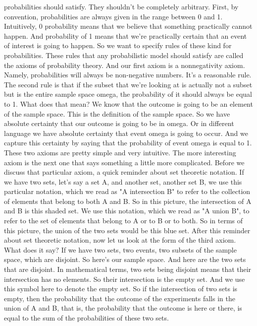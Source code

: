 \documentclass[pdftex, brazil, 12pt, twoside]{article}
\begin{document}
probabilities should satisfy.
They shouldn't be completely arbitrary.
First, by convention, probabilities are always given
in the range between 0 and 1.
Intuitively, 0 probability means that we believe that
something practically cannot happen.
And probability of 1 means that we're practically certain
that an event of interest is going to happen.
So we want to specify rules of these kind for probabilities.
These rules that any probabilistic model should
satisfy are called the axioms of probability theory.
And our first axiom is a nonnegativity axiom.
Namely, probabilities will always be
non-negative numbers.
It's a reasonable rule.
The second rule is that if the subset that we're looking at
is actually not a subset but is the entire sample space
omega, the probability of it should always be equal to 1.
What does that mean?
We know that the outcome is going to be an element of the
sample space.
This is the definition of the sample space.
So we have absolute certainty that our outcome is going to
be in omega.
Or in different language we have absolute certainty that
event omega is going to occur.
And we capture this certainty by saying that the probability
of event omega is equal to 1.
These two axioms are pretty simple and very intuitive.
The more interesting axiom is the next one that says
something a little more complicated.
Before we discuss that particular axiom, a quick
reminder about set theoretic notation.
If we have two sets, let's say a set A, and another set,
another set B, we use this particular notation, which we
read as "A intersection B" to refer to the collection of
elements that belong to both A and B. So in this picture, the
intersection of A and B is this shaded set.
We use this notation, which we read as "A union B", to refer
to the set of elements that belong to A
or to B or to both.
So in terms of this picture, the union of the two sets
would be this blue set.
After this reminder about set theoretic notation, now let us
look at the form of the third axiom.
What does it say?
If we have two sets, two events, two subsets of the
sample space, which are disjoint.
So here's our sample space.
And here are the two sets that are disjoint.
In mathematical terms, two sets being disjoint means that
their intersection has no elements.
So their intersection is the empty set.
And we use this symbol here to denote the empty set.
So if the intersection of two sets is empty, then the
probability that the outcome of the experiments falls in
the union of A and B, that is, the probability that the
outcome is here or there, is equal to the sum of the
probabilities of these two sets.
\end{document}
